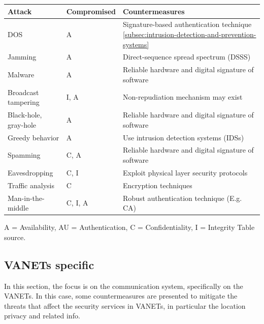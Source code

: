 \begin{table}[h]
    \centering
    \begin{tabular}{|l|l|l|}
        \hline
        \textbf{Attack} & \textbf{Compromised} & \textbf{Countermeasures} \\ \hline
        DOS & A & Signature-based authentication technique \ref{subsec:intrusion-detection-and-prevention-systems} \\ \hline
        Jamming & A & Direct-sequence spread spectrum (DSSS\cite{wang2022when}) \\ \hline
        Malware & A & Reliable hardware and digital signature of software \\ \hline
        Broadcast tampering & I, A & Non-repudiation mechanism may exist \\ \hline
        Black-hole, gray-hole & A & Reliable hardware and digital signature of software \\ \hline
        Greedy behavior & A & Use intrusion detection systems (IDSs) \\ \hline
        Spamming & C, A & Reliable hardware and digital signature of software \\ \hline
        Eavesdropping & C, I & Exploit physical layer security protocols \\ \hline
        Traffic analysis & C & Encryption techniques \\ \hline
        Man-in-the-middle & C, I, A & Robust authentication technique (E.g. CA) \\ \hline
    \end{tabular}
    \label{tab:Summary of Attacks and Countermeasures}
\end{table}
A = Availability, AU = Authentication, C = Confidentiality, I = Integrity
Table source\cite{sheikh2019comprehensive}.

\subsection{VANETs specific}\label{subsec:v2x-communication-and-network}

In this section, the focus is on the communication system, specifically on the VANETs.
In this case, some countermeasures are presented to mitigate the threats that affect the security services in VANETs, in particular the location privacy and related info.

